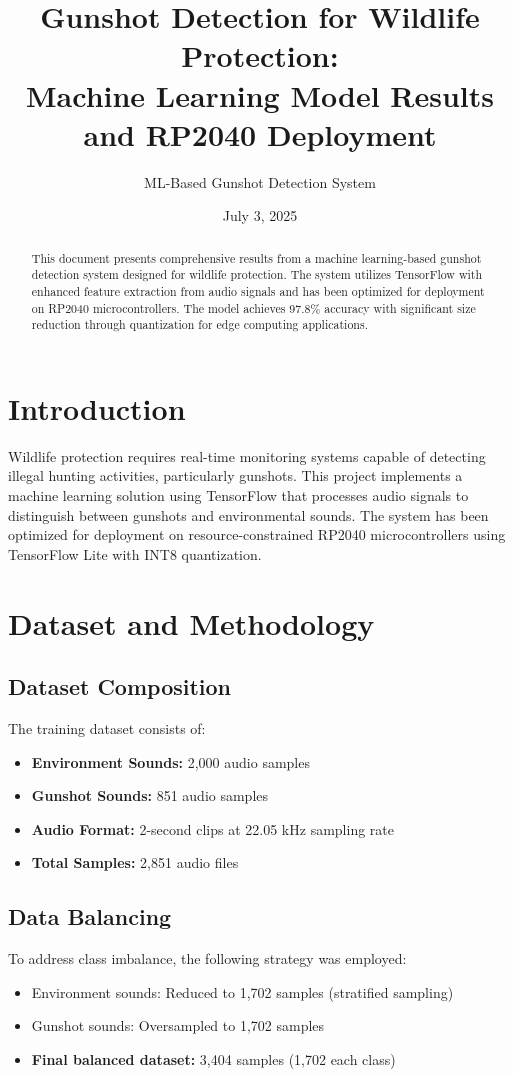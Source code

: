 \documentclass[12pt]{article}
\title{Gunshot Detection for Wildlife Protection: \\
Machine Learning Model Results and RP2040 Deployment}
\author{ML-Based Gunshot Detection System}
\date{July 3, 2025}
\begin{document}
\maketitle

\begin{abstract}
This document presents comprehensive results from a machine learning-based gunshot detection system designed for wildlife protection. The system utilizes TensorFlow with enhanced feature extraction from audio signals and has been optimized for deployment on RP2040 microcontrollers. The model achieves 97.8\% accuracy with significant size reduction through quantization for edge computing applications.
\end{abstract}

\section{Introduction}

Wildlife protection requires real-time monitoring systems capable of detecting illegal hunting activities, particularly gunshots. This project implements a machine learning solution using TensorFlow that processes audio signals to distinguish between gunshots and environmental sounds. The system has been optimized for deployment on resource-constrained RP2040 microcontrollers using TensorFlow Lite with INT8 quantization.

\section{Dataset and Methodology}

\subsection{Dataset Composition}
The training dataset consists of:
\begin{itemize}
    \item \textbf{Environment Sounds:} 2,000 audio samples
    \item \textbf{Gunshot Sounds:} 851 audio samples
    \item \textbf{Audio Format:} 2-second clips at 22.05 kHz sampling rate
    \item \textbf{Total Samples:} 2,851 audio files
\end{itemize}

\subsection{Data Balancing}
To address class imbalance, the following strategy was employed:
\begin{itemize}
    \item Environment sounds: Reduced to 1,702 samples (stratified sampling)
    \item Gunshot sounds: Oversampled to 1,702 samples
    \item \textbf{Final balanced dataset:} 3,404 samples (1,702 each class)
\end{itemize}
\end{document}
